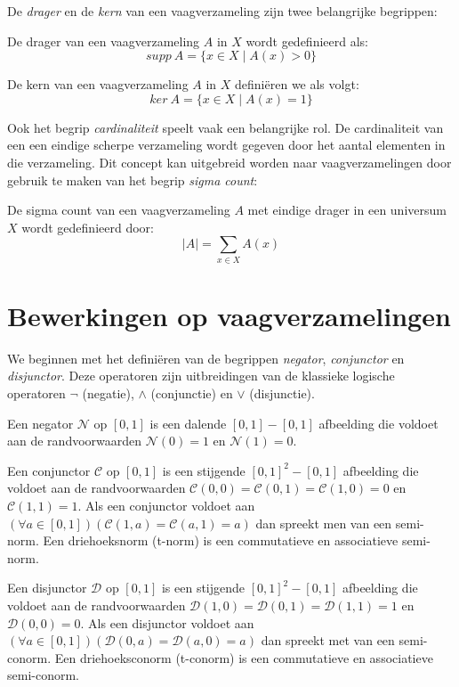 De \emph{drager} en de \emph{kern} van een vaagverzameling zijn twee belangrijke begrippen: 
\begin{definitie}
De drager van een vaagverzameling $A$ in $X$ wordt gedefinieerd als:
$$
supp\ A = \{x \in X \mid A(x) > 0\} 
$$
\end{definitie}
\begin{definitie}
De kern van een vaagverzameling $A$ in $X$ defini\"eren we als volgt:
$$
ker\ A = \{x \in X \mid A(x) = 1\}
$$
\end{definitie}
\noindent
Ook het begrip \emph{cardinaliteit} speelt vaak een belangrijke rol. De cardinaliteit van een 
een eindige scherpe verzameling wordt gegeven door het aantal elementen in die verzameling. 
Dit concept kan uitgebreid worden naar vaagverzamelingen door gebruik te maken van het begrip 
\emph{sigma count}:
\begin{definitie}
De sigma count van een vaagverzameling $A$ met eindige drager in een universum $X$ wordt
gedefinieerd door:
$$
|A|=\sum_{x \in X} A(x)
$$
\end{definitie}

\section{Bewerkingen op vaagverzamelingen}
\label{sectie:bew_op_vaagverz}

We beginnen met het defini\"eren van de begrippen \emph{negator}, \emph{conjunctor} en 
\emph{disjunctor}. Deze operatoren zijn uitbreidingen van de klassieke logische operatoren
$\lnot$ (negatie), $\land$ (conjunctie) en $\lor$ (disjunctie).
\begin{definitie}
Een negator $\mathcal{N}$ op $[0,1]$ is een dalende $[0,1] - [0,1]$ afbeelding die voldoet
aan de randvoorwaarden $\mathcal{N}(0)=1$ en $\mathcal{N}(1)=0$. 
\end{definitie}
\begin{definitie}
Een conjunctor $\mathcal{C}$ op $[0,1]$ is een stijgende $[0,1]^2 - [0,1]$ afbeelding die voldoet aan de
randvoorwaarden $\mathcal{C}(0,0)=\mathcal{C}(0,1)=\mathcal{C}(1,0)=0$ en $\mathcal{C}(1,1)=1$. 
Als een conjunctor voldoet aan 
$(\forall a \in [0,1])(\mathcal{C}(1,a)=\mathcal{C}(a,1)=a)$ dan spreekt men van een semi-norm.
Een driehoeksnorm (t-norm) is een commutatieve en associatieve semi-norm.
\end{definitie}
\begin{definitie}
Een disjunctor $\mathcal{D}$ op $[0,1]$ is een stijgende $[0,1]^2 - [0,1]$ afbeelding die voldoet
aan de randvoorwaarden $\mathcal{D}(1,0)=\mathcal{D}(0,1)=\mathcal{D}(1,1)=1$ en 
$\mathcal{D}(0,0)=0$. Als een disjunctor voldoet aan 
$(\forall a \in [0,1])(\mathcal{D}(0,a)=\mathcal{D}(a,0)=a)$ dan spreekt met van een semi-conorm.
Een driehoeksconorm (t-conorm) is een commutatieve en associatieve semi-conorm.
\end{definitie}

